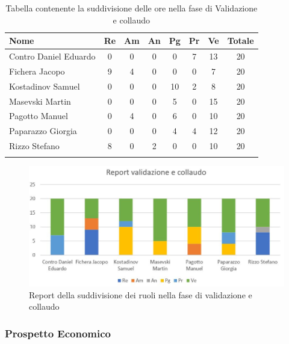 \documentclass[../piano_di_progetto.tex]{subfiles}
\begin{document}
\begin{center}
	\begin{longtable}{|l|c|c|c|c|c|c|c|}
		\hline
		\rowcolor{lightgray}
		\textbf{Nome} & \textbf{Re} & \textbf{Am} & \textbf{An} & \textbf{Pg}  & \textbf{Pr}   & \textbf{Ve} & \textbf{Totale} \\

		\hline
			Contro Daniel Eduardo & 0 & 0 & 0 & 0 & 7 & 13 & 20\\
			Fichera Jacopo & 9 & 4 & 0 & 0 & 0 & 7 & 20 \\ 
			Kostadinov Samuel & 0 & 0 & 0 & 10 & 2 & 8 & 20 \\ 		
			Masevski Martin & 0 & 0 & 0 & 5 & 0 & 15 & 20 \\
			Pagotto Manuel & 0 & 4 & 0 & 6 & 0 & 10 & 20 \\			
			Paparazzo Giorgia & 0 & 0 & 0 & 4 & 4 & 12 & 20 \\
			Rizzo Stefano & 8 & 0 & 2 & 0 & 0 & 10 & 20 \\
			\hline
		\rowcolor{white}
		\caption{Tabella contenente la suddivisione delle ore nella fase di Validazione e collaudo}
	\end{longtable}
\end{center}

\begin{figure}[H]
\centering
\includegraphics[width=12cm]{componenti/img/report_valid_collaudo}
\caption{Report della suddivisione dei ruoli nella fase di validazione e collaudo}
\end{figure}

\subsubsection{Prospetto Economico}
\end{document}

